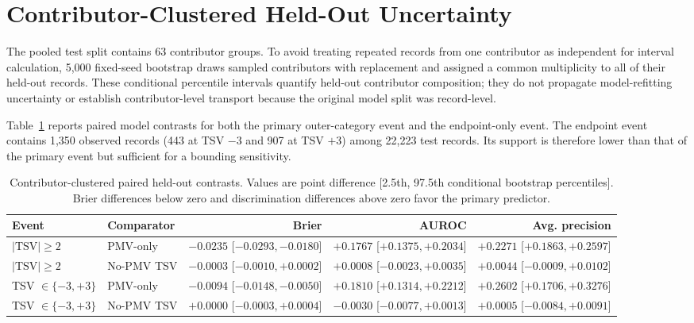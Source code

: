 \documentclass[11pt]{article}
\begin{document}
\section{Contributor-Clustered Held-Out Uncertainty}

The pooled test split contains 63 contributor groups. To avoid treating repeated records from one contributor as independent for interval calculation, 5{,}000 fixed-seed bootstrap draws sampled contributors with replacement and assigned a common multiplicity to all of their held-out records. These conditional percentile intervals quantify held-out contributor composition; they do not propagate model-refitting uncertainty or establish contributor-level transport because the original model split was record-level.

Table~\ref{tab:supp_heldout_cluster_contrasts} reports paired model contrasts for both the primary outer-category event and the endpoint-only event. The endpoint event contains 1{,}350 observed records (443 at TSV $-3$ and 907 at TSV $+3$) among 22{,}223 test records. Its support is therefore lower than that of the primary event but sufficient for a bounding sensitivity.

\begin{table}[htbp]
\centering
\caption{Contributor-clustered paired held-out contrasts. Values are point difference [2.5th, 97.5th conditional bootstrap percentiles]. Brier differences below zero and discrimination differences above zero favor the primary predictor.}
\label{tab:supp_heldout_cluster_contrasts}
\scriptsize
\setlength{\tabcolsep}{2.0pt}
\begin{tabular}{llrrr}
\toprule
Event & Comparator & Brier & AUROC & Avg. precision \\
\midrule
$|\mathrm{TSV}|\ge2$ & PMV-only & $-0.0235$ [$-0.0293,-0.0180$] & $+0.1767$ [$+0.1375,+0.2034$] & $+0.2271$ [$+0.1863,+0.2597$] \\
$|\mathrm{TSV}|\ge2$ & No-PMV TSV & $-0.0003$ [$-0.0010,+0.0002$] & $+0.0008$ [$-0.0023,+0.0035$] & $+0.0044$ [$-0.0009,+0.0102$] \\
TSV $\in\{-3,+3\}$ & PMV-only & $-0.0094$ [$-0.0148,-0.0050$] & $+0.1810$ [$+0.1314,+0.2212$] & $+0.2602$ [$+0.1706,+0.3276$] \\
TSV $\in\{-3,+3\}$ & No-PMV TSV & $+0.0000$ [$-0.0003,+0.0004$] & $-0.0030$ [$-0.0077,+0.0013$] & $+0.0005$ [$-0.0084,+0.0091$] \\
\bottomrule
\end{tabular}
\end{table}
\end{document}
